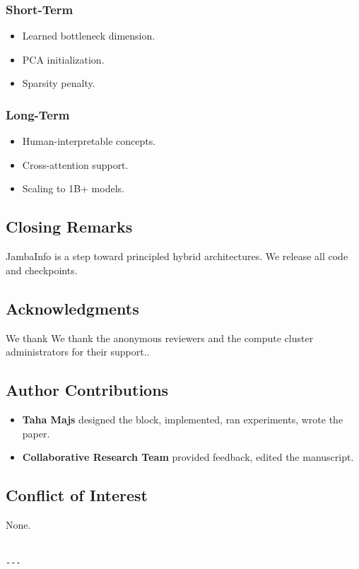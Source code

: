 \subsubsection{Short-Term}
\begin{itemize}
\item Learned bottleneck dimension.
\item PCA initialization.
\item Sparsity penalty.

\end{itemize}
\subsubsection{Long-Term}
\begin{itemize}
\item Human-interpretable concepts.
\item Cross-attention support.
\item Scaling to 1B+ models.

\end{itemize}
\subsection{Closing Remarks}

JambaInfo is a step toward principled hybrid architectures. We release 
all code and checkpoints.

\subsection{Acknowledgments}

We thank We thank the anonymous reviewers and the compute cluster administrators for their support..

\subsection{Author Contributions}

\begin{itemize}
\item \textbf{Taha Majs} designed the block, implemented, ran experiments, wrote
  the paper.
\item \textbf{Collaborative Research Team} provided feedback, edited the manuscript.

\end{itemize}
\subsection{Conflict of Interest}

None.
\begin{lstlisting}

---
\end{lstlisting}